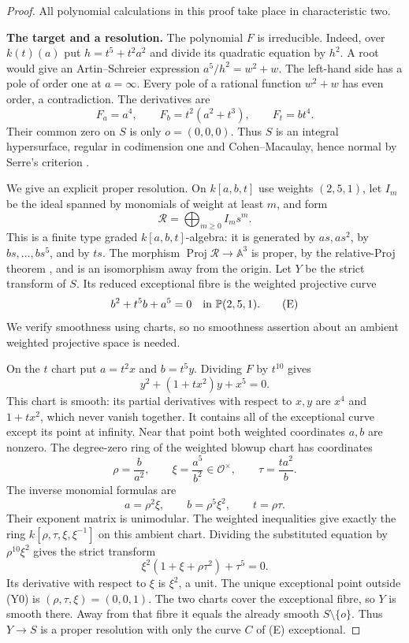 \begin{proof}
All polynomial calculations in this proof take place in
characteristic two.

\par\smallskip\noindent\textbf{The target and a resolution.}\quad
The polynomial $F$ is irreducible.  Indeed, over $k(t)(a)$ put
$h=t^5+t^2a^2$ and divide its quadratic equation by $h^2$.
A root would give an Artin--Schreier expression
$a^5/h^2=w^2+w$.  The left-hand side has a pole of order one
at $a=\infty$.  Every pole of a rational function $w^2+w$
has even order, a contradiction.  The derivatives are
\[
             F_a=a^4,\qquad F_b=t^2(a^2+t^3),
             \qquad F_t=bt^4.
\]
Their common zero on $S$ is only $o=(0,0,0)$.  Thus $S$ is
an integral hypersurface, regular in codimension one and
Cohen--Macaulay, hence normal by Serre's criterion
\cite[Lemma 10.157.4, tag 031S]{StacksBWildCurve}.

We give an explicit proper resolution.  On $k[a,b,t]$ use
weights $(2,5,1)$, let $I_m$ be the ideal spanned by monomials
of weight at least $m$, and form
\[
 \mathcal R=\bigoplus_{m\geq0}I_m s^m.
\]
This is a finite type graded $k[a,b,t]$-algebra: it is generated
by $as,as^2$, by $bs,\ldots,bs^5$, and by $ts$.
The morphism $\operatorname{Proj}\mathcal R\to\mathbb A^3$
is proper, by the relative-Proj theorem
\cite[Lemma 31.31.4, tag 07ZW]{StacksBWildCurve}, and is an
isomorphism away from the origin.  Let $Y$ be the strict
transform of $S$.  Its reduced exceptional fibre is the
weighted projective curve
\[
               b^2+t^5b+a^5=0
                    \quad\hbox{in }\mathbb P(2,5,1).
 \tag{E}
\]
We verify smoothness using charts, so no smoothness assertion
about an ambient weighted projective space is needed.

On the $t$ chart put $a=t^2x$ and $b=t^5y$.  Dividing $F$ by
$t^{10}$ gives
\[
                    y^2+(1+tx^2)y+x^5=0.
 \tag{Y0}
\]
This chart is smooth: its partial derivatives with respect to
$x,y$ are $x^4$ and $1+tx^2$, which never vanish together.
It contains all of the exceptional curve except its point at
infinity.  Near that point both weighted coordinates $a,b$
are nonzero.  The degree-zero ring of the weighted blowup
chart has coordinates
\[
 \rho=\frac b{a^2},\qquad
 \xi=\frac{a^5}{b^2}\in\mathcal O^\times,
 \qquad \tau=\frac{ta^2}{b}.
\]
The inverse monomial formulas are
\[
                  a=\rho^2\xi,
       \qquad b=\rho^5\xi^2,
       \qquad t=\rho\tau.
\]
Their exponent matrix is unimodular.  The weighted inequalities
give exactly the ring $k[\rho,\tau,\xi,\xi^{-1}]$ on this
ambient chart.  Dividing the substituted equation by
$\rho^{10}\xi^2$ gives the strict transform
\[
                  \xi^2(1+\xi+\rho\tau^2)+\tau^5=0.
 \tag{Yinf}
\]
Its derivative with respect to $\xi$ is $\xi^2$, a unit.
The unique exceptional point outside (Y0) is
$(\rho,\tau,\xi)=(0,0,1)$.  The two charts cover the
exceptional fibre, so $Y$ is smooth there.  Away from that
fibre it equals the already smooth $S\setminus\{o\}$.
Thus $Y\to S$ is a proper resolution with only the curve
$C$ of (E) exceptional.


\end{proof}
